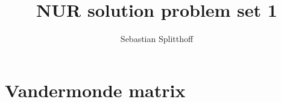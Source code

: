 \documentclass[a4paper,10pt]{article}
\title{NUR solution problem set 1}
\author{Sebastian Splitthoff}
\begin{document}
\maketitle



\section{Vandermonde matrix}










\end{document}
